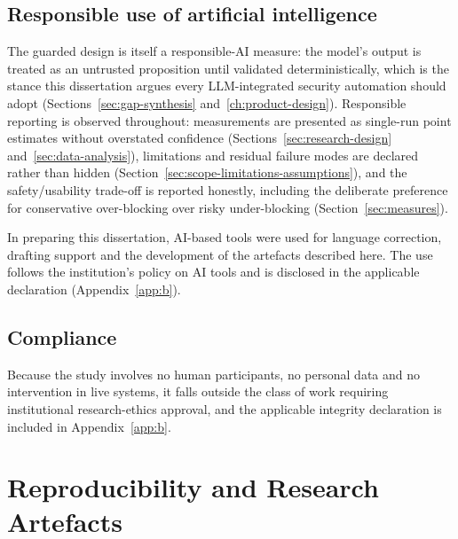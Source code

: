 \subsection*{Responsible use of artificial intelligence}

The guarded design is itself a responsible-AI measure: the model's output is
treated as an untrusted proposition until validated deterministically, which is
the stance this dissertation argues every LLM-integrated security automation
should adopt (Sections~\ref{sec:gap-synthesis} and~\ref{ch:product-design}).
Responsible reporting is observed throughout: measurements are presented as
single-run point estimates without overstated confidence
(Sections~\ref{sec:research-design} and~\ref{sec:data-analysis}), limitations
and residual failure modes are declared rather than hidden
(Section~\ref{sec:scope-limitations-assumptions}), and the safety/usability
trade-off is reported honestly, including the deliberate preference for
conservative over-blocking over risky under-blocking (Section~\ref{sec:measures}).

In preparing this dissertation, AI-based tools were used for language
correction, drafting support and the development of the artefacts described
here. The use follows the institution's policy on AI tools and is disclosed in
the applicable declaration (Appendix~\ref{app:b}).

\subsection*{Compliance}

Because the study involves no human participants, no personal data and no
intervention in live systems, it falls outside the class of work requiring
institutional research-ethics approval, and the applicable integrity declaration
is included in Appendix~\ref{app:b}.


\section{Reproducibility and Research Artefacts}\label{sec:reproducibility}

